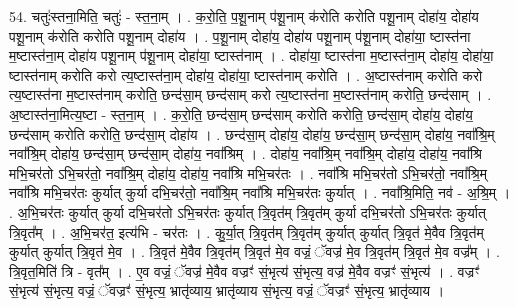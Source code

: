 \documentclass[17pt]{extarticle}
\begin{document}
54. चतुः॑स्तना॒मिति॒ चतुः॑ - स्त॒ना॒म् । . क॒रो॒ति॒ प॒शू॒नाम् प॑शू॒नाम् क॑रोति करोति पशू॒नाम् दोहा॑य॒ दोहा॑य पशू॒नाम् क॑रोति करोति पशू॒नाम् दोहा॑य । . प॒शू॒नाम् दोहा॑य॒ दोहा॑य पशू॒नाम् प॑शू॒नाम् दोहा॑या॒ ष्टास्त॑ना म॒ष्टास्त॑ना॒म् दोहा॑य पशू॒नाम् प॑शू॒नाम् दोहा॑या॒ ष्टास्त॑नाम् । . दोहा॑या॒ ष्टास्त॑ना म॒ष्टास्त॑ना॒म् दोहा॑य॒ दोहा॑या॒ ष्टास्त॑नाम् करोति करो त्य॒ष्टास्त॑ना॒म् दोहा॑य॒ दोहा॑या॒ ष्टास्त॑नाम् करोति । . अ॒ष्टास्त॑नाम् करोति करो त्य॒ष्टास्त॑ना म॒ष्टास्त॑नाम् करोति॒ छन्द॑सा॒म् छन्द॑साम् करो त्य॒ष्टास्त॑ना म॒ष्टास्त॑नाम् करोति॒ छन्द॑साम् । . अ॒ष्टास्त॑ना॒मित्य॒ष्टा - स्त॒ना॒म् । . क॒रो॒ति॒ छन्द॑सा॒म् छन्द॑साम् करोति करोति॒ छन्द॑सा॒म् दोहा॑य॒ दोहा॑य॒ छन्द॑साम् करोति करोति॒ छन्द॑सा॒म् दोहा॑य । . छन्द॑सा॒म् दोहा॑य॒ दोहा॑य॒ छन्द॑सा॒म् छन्द॑सा॒म् दोहा॑य॒ नवा᳚श्रि॒म् नवा᳚श्रि॒म् दोहा॑य॒ छन्द॑सा॒म् छन्द॑सा॒म् दोहा॑य॒ नवा᳚श्रिम् । . दोहा॑य॒ नवा᳚श्रि॒म् नवा᳚श्रि॒म् दोहा॑य॒ दोहा॑य॒ नवा᳚श्रि मभि॒चर॑तो ऽभि॒चर॑तो॒ नवा᳚श्रि॒म् दोहा॑य॒ दोहा॑य॒ नवा᳚श्रि मभि॒चर॑तः । . नवा᳚श्रि मभि॒चर॑तो ऽभि॒चर॑तो॒ नवा᳚श्रि॒म् नवा᳚श्रि मभि॒चर॑तः कुर्यात् कुर्या दभि॒चर॑तो॒ नवा᳚श्रि॒म् नवा᳚श्रि मभि॒चर॑तः कुर्यात् । . नवा᳚श्रि॒मिति॒ नव॑ - अ॒श्रि॒म् । . अ॒भि॒चर॑तः कुर्यात् कुर्या दभि॒चर॑तो ऽभि॒चर॑तः कुर्यात् त्रि॒वृत॑म् त्रि॒वृत॑म् कुर्या दभि॒चर॑तो ऽभि॒चर॑तः कुर्यात् त्रि॒वृत᳚म् । . अ॒भि॒चर॑त॒ इत्य॑भि - चर॑तः । . कु॒र्या॒त् त्रि॒वृत॑म् त्रि॒वृत॑म् कुर्यात् कुर्यात् त्रि॒वृत॑ मे॒वैव त्रि॒वृत॑म् कुर्यात् कुर्यात् त्रि॒वृत॑ मे॒व । . त्रि॒वृत॑ मे॒वैव त्रि॒वृत॑म् त्रि॒वृत॑ मे॒व वज्रं॒ ॅवज्र॑ मे॒व त्रि॒वृत॑म् त्रि॒वृत॑ मे॒व वज्र᳚म् । . त्रि॒वृत॒मिति॑ त्रि - वृत᳚म् । . ए॒व वज्रं॒ ॅवज्र॑ मे॒वैव वज्रꣳ॑ सं॒भृत्य॑ सं॒भृत्य॒ वज्र॑ मे॒वैव वज्रꣳ॑ सं॒भृत्य॑ । . वज्रꣳ॑ सं॒भृत्य॑ सं॒भृत्य॒ वज्रं॒ ॅवज्रꣳ॑ सं॒भृत्य॒ भ्रातृ॑व्याय॒ भ्रातृ॑व्याय सं॒भृत्य॒ वज्रं॒ ॅवज्रꣳ॑ सं॒भृत्य॒ भ्रातृ॑व्याय । \newline
\end{document}

